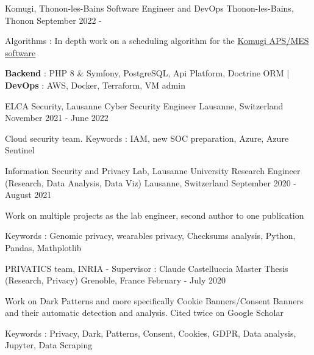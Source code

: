 


\begin{cventries}
	
	\cventry
	{Komugi, Thonon-les-Bains} %
	{Software Engineer and DevOps} %
	{Thonon-les-Bains, Thonon} %
	{September 2022 - } %
	{ %
		\begin{cvitems}
			\item {Algorithms : In depth work on a scheduling algorithm for the \href{https://www.komugi.io/fr/}{Komugi APS/MES software}}
			\item {\textbf{Backend} : PHP 8 \& Symfony, PostgreSQL, Api Platform, Doctrine ORM | \textbf{DevOps} : AWS, Docker, Terraform, VM admin}
		\end{cvitems}
	}
	
	\cventry
	{ELCA Security, Lausanne} %
	{Cyber Security Engineer} %
	{Lausanne, Switzerland} %
	{November 2021 - June 2022} %
	{ %
		\begin{cvitems}
			\item {Cloud security team. Keywords : IAM, new SOC preparation, Azure, Azure Sentinel}
		\end{cvitems}
	}
	
	\cventry
	{Information Security and Privacy Lab, Lausanne University} %
	{Research Engineer (Research, Data Analysis, Data Viz)} %
	{Lausanne, Switzerland} %
	{September 2020 - August 2021} %
	{ %
		\begin{cvitems}
			\item {Work on multiple projects as the lab engineer, second author to one publication}
			\item {Keywords : Genomic privacy, wearables privacy, Checksums analysis, Python, Pandas, Mathplotlib}
		\end{cvitems}
	}
	
	\cventry
	{PRIVATICS team, INRIA - Supervisor : Claude Castelluccia} %
	{Master Thesis (Research, Privacy)} %
	{Grenoble, France} %
	{February - July 2020} %
	{ %
		\begin{cvitems}
			\item {Work on Dark Patterns and more specifically Cookie Banners/Consent Banners and their automatic detection and analysis. Cited twice on Google Scholar}
			\item {Keywords : Privacy, Dark, Patterns, Consent, Cookies, GDPR, Data analysis, Jupyter, Data Scraping}
		\end{cvitems}
	}
	

\end{cventries}
